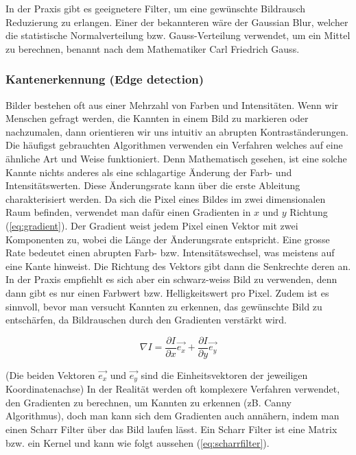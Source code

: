In der Praxis gibt es geeignetere Filter, um eine gewünschte Bildrausch Reduzierung zu erlangen. Einer der bekannteren wäre der Gaussian Blur, welcher die statistische Normalverteilung bzw. Gauss-Verteilung verwendet, um ein Mittel zu berechnen, benannt nach dem Mathematiker Carl Friedrich Gauss. \cite{carlfriedrichgauss:1}

\subsubsection{Kantenerkennung (Edge detection)}
\label{subsec:kanntenerkennung}

Bilder bestehen oft aus einer Mehrzahl von Farben und Intensitäten. Wenn wir Menschen gefragt werden, die Kannten in einem Bild zu markieren oder nachzumalen, dann orientieren wir uns intuitiv an abrupten Kontraständerungen. Die häufigst gebrauchten Algorithmen verwenden ein Verfahren welches auf eine ähnliche Art und Weise funktioniert. Denn Mathematisch gesehen, ist eine solche Kannte nichts anderes als eine schlagartige Änderung der Farb- und Intensitätswerten. Diese Änderungsrate kann über die erste Ableitung charakterisiert werden. Da sich die Pixel eines Bildes im zwei dimensionalen Raum befinden, verwendet man dafür einen Gradienten in $x$ und $y$ Richtung (\ref{eq:gradient}). Der Gradient weist jedem Pixel einen Vektor mit zwei Komponenten zu, wobei die Länge der Änderungsrate entspricht. Eine grosse Rate bedeutet einen abrupten Farb- bzw. Intensitätswechsel, was meistens auf eine Kante hinweist. Die Richtung des Vektors gibt dann die Senkrechte deren an. In der Praxis empfiehlt es sich aber ein schwarz-weiss Bild zu verwenden, denn dann gibt es nur einen Farbwert bzw. Helligkeitswert pro Pixel. Zudem ist es sinnvoll, bevor man versucht Kannten zu erkennen, das gewünschte Bild zu entschärfen, da Bildrauschen durch den Gradienten verstärkt wird. \cite{computervision_szeliski:2}

\begin{equation}
	\nabla I = \frac{\partial I}{\partial x} \vec{e_{x}} + \frac{\partial I}{\partial y} \vec{e_{y}}
	\label{eq:gradient}
\end{equation}
\cite{computervision_szeliski:2}

(Die beiden Vektoren $\vec{e_x}$ und $\vec{e_y}$ sind die Einheitsvektoren der jeweiligen Koordinatenachse) In der Realität werden oft komplexere Verfahren verwendet, den Gradienten zu berechnen, um Kannten zu erkennen (zB. Canny Algorithmus), doch man kann sich dem Gradienten auch annähern, indem man einen Scharr Filter über das Bild laufen lässt. Ein Scharr Filter ist eine Matrix bzw. ein Kernel und kann wie folgt aussehen (\ref{eq:scharrfilter}). \cite{computervision_szeliski:2}

